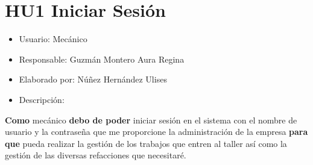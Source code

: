\section{HU1 Iniciar Sesión}
	\begin{itemize}
	\item Usuario: Mecánico
	\item Responsable: Guzmán Montero Aura Regina
	\item Elaborado por: Núñez Hernández Ulises
	\item Descripción:\\
\end{itemize}

\textbf{Como} mecánico \textbf{debo de poder} iniciar sesión en el sistema con el nombre de usuario y la contraseña que me proporcione la administración de la empresa \textbf{para que} pueda realizar la gestión de los trabajos que entren al taller así como la gestión de las diversas refacciones que necesitaré. 